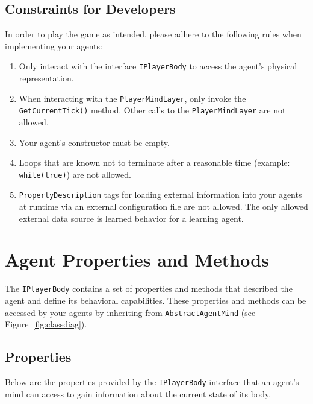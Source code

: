 \documentclass[a4paper,english,DIV=16,11pt,parskip=half,dvipsnames,listof=totoc,index=totoc,bibliography=totoc]{scrartcl}
\newcommand\todo[1]{\textcolor{red}{#1}}
\begin{document}
%
\subsection{Constraints for Developers}
In order to play the game as intended, please adhere to the following rules when implementing your agents:
\begin{enumerate}
  \item Only interact with the interface \texttt{IPlayerBody} to access the agent's physical representation.
  \item When interacting with the \texttt{PlayerMindLayer}, only invoke the \texttt{GetCurrentTick()} method. Other calls to the \texttt{PlayerMindLayer} are not allowed.
  \item Your agent's constructor must be empty. %
  \item Loops that are known not to terminate after a reasonable time (example: \texttt{while(true)}) are not allowed.
  \item \texttt{PropertyDescription} tags for loading external information into your agents at runtime via an external configuration file are not allowed. The only allowed external data source is learned behavior for a learning agent.
\end{enumerate}
%
\section{Agent Properties and Methods} \label{sec:AgentDesc}
The \texttt{IPlayerBody} contains a set of properties and methods that described the agent and define its behavioral capabilities. These properties and methods can be accessed by your agents by inheriting from \texttt{AbstractAgentMind} (see Figure~\ref{fig:classdiag}).
%
\subsection{Properties} \label{ssec:props}
Below are the properties provided by the \texttt{IPlayerBody} interface that an agent's mind can access to gain information about the current state of its body.
%
\end{document}
